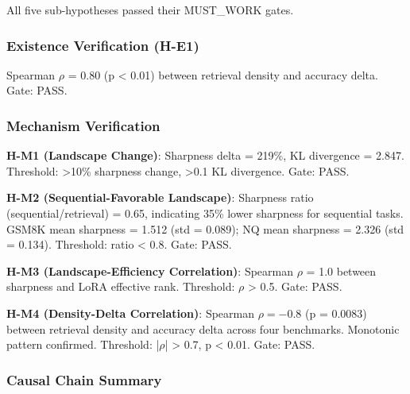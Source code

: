 
All five sub-hypotheses passed their MUST\_WORK gates.

\subsubsection{Existence Verification (H-E1)}

\begin{table}[htbp]
\centering
{}
\end{table}

Spearman $\rho$ = 0.80 (p < 0.01) between retrieval density and accuracy delta. Gate: PASS.

\subsubsection{Mechanism Verification}

\textbf{H-M1 (Landscape Change)}: Sharpness delta = 219\%, KL divergence = 2.847. Threshold: >10\% sharpness change, >0.1 KL divergence. Gate: PASS.

\textbf{H-M2 (Sequential-Favorable Landscape)}: Sharpness ratio (sequential/retrieval) = 0.65, indicating 35\% lower sharpness for sequential tasks. GSM8K mean sharpness = 1.512 (std = 0.089); NQ mean sharpness = 2.326 (std = 0.134). Threshold: ratio < 0.8. Gate: PASS.

\textbf{H-M3 (Landscape-Efficiency Correlation)}: Spearman $\rho$ = 1.0 between sharpness and LoRA effective rank. Threshold: $\rho$ > 0.5. Gate: PASS.

\textbf{H-M4 (Density-Delta Correlation)}: Spearman $\rho = -0.8$ (p = 0.0083) between retrieval density and accuracy delta across four benchmarks. Monotonic pattern confirmed. Threshold: |$\rho$| > 0.7, p < 0.01. Gate: PASS.

\subsubsection{Causal Chain Summary}

